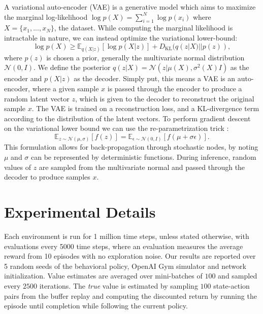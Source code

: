 \documentclass{article}
\newcommand{\e}{\epsilon}
\newcommand{\s}{\sigma}
\newcommand{\E}{\mathbb{E}}
\newcommand{\N}{\mathcal{N}}
\begin{document}
A variational auto-encoder (VAE) \citep{kingma2013auto} is a generative model which aims to maximize the marginal log-likelihood $\log p(X) = \sum_{i=1}^N \log p(x_i)$ where $X = \{x_1, ..., x_N\}$, the dataset. While computing the marginal likelihood is intractable in nature, we can instead optimize the variational lower-bound: 
\begin{equation} \label{vae}
\log p(X) \geq \E_{q(X|z)}[ \log p(X|z) ] + D_{\text{KL}}(q(z|X)||p(z)),
\end{equation}
where $p(z)$ is chosen a prior, generally the multivariate normal distribution $\N(0,I)$. We define the posterior $q(z|X) = \N(z|\mu(X), \s^2(X)I)$ as the encoder and $p(X|z)$ as the decoder. Simply put, this means a VAE is an auto-encoder, where a given sample $x$ is passed through the encoder to produce a random latent vector $z$, which is given to the decoder to reconstruct the original sample $x$. The VAE is trained on a reconstruction loss, and a KL-divergence term according to the distribution of the latent vectors. To perform gradient descent on the variational lower bound we can use the re-parametrization trick \citep{kingma2013auto,rezende2014stochastic}:
\begin{equation}
\E_{z \sim \N(\mu, \s)}[f(z)] = \E_{\e \sim \N(0, I)}[f(\mu + \s \e)].
\end{equation}
This formulation allows for back-propagation through stochastic nodes, by noting $\mu$ and $\s$ can be represented by deterministic functions. During inference, random values of $z$ are sampled from the multivariate normal and passed through the decoder to produce samples $x$. 

\clearpage

\section{Experimental Details} \label{appendix:experimental}

Each environment is run for 1 million time steps, unless stated otherwise, with evaluations every 5000 time steps, where an evaluation measures the average reward from 10 episodes with no exploration noise. Our results are reported over 5 random seeds of the behavioral policy, OpenAI Gym simulator and network initialization. Value estimates are averaged over mini-batches of $100$ and sampled every $2500$ iterations. The \textit{true} value is estimated by sampling $100$ state-action pairs from the buffer replay and computing the discounted return by running the episode until completion while following the current policy.
\end{document}
